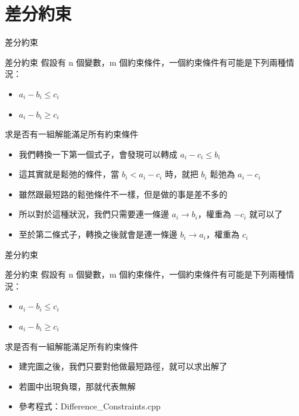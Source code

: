 \documentclass[aspectratio=169]{beamer}
\begin{document}
    \section{差分約束}

    \begin{frame}{差分約束}
        \begin{block}{差分約束}
            假設有 n 個變數，m 個約束條件，一個約束條件有可能是下列兩種情況：
            \begin{itemize}
                \item $a_i - b_i \le c_i$
                \item $a_i - b_i \ge c_i$
            \end{itemize}
            求是否有一組解能滿足所有約束條件
        \end{block}

        \begin{itemize}
            \item<2-> 我們轉換一下第一個式子，會發現可以轉成 $a_i - c_i \le b_i$
            \item<3-> 這其實就是鬆弛的條件，當 $b_i < a_i - c_i$ 時，就把 $b_i$ 鬆弛為 $a_i - c_i$
            \item<4-> 雖然跟最短路的鬆弛條件不一樣，但是做的事是差不多的
            \item<5-> 所以對於這種狀況，我們只需要連一條邊 $a_i \rightarrow b_i$，權重為 $-c_i$ 就可以了
            \item<6-> 至於第二條式子，轉換之後就會是連一條邊 $b_i \rightarrow a_i$，權重為 $c_i$
        \end{itemize}
    \end{frame}    

    
    \begin{frame}{差分約束}
        \begin{block}{差分約束}
            假設有 n 個變數，m 個約束條件，一個約束條件有可能是下列兩種情況：
            \begin{itemize}
                \item $a_i - b_i \le c_i$
                \item $a_i - b_i \ge c_i$
            \end{itemize}
            求是否有一組解能滿足所有約束條件
        \end{block}

        \begin{itemize}
            \item<1-> 建完圖之後，我們只要對他做最短路徑，就可以求出解了
            \item<2-> 若圖中出現負環，那就代表無解
            \item<2-> 參考程式：Difference\_Constraints.cpp
        \end{itemize}
    \end{frame}    
\end{document}
